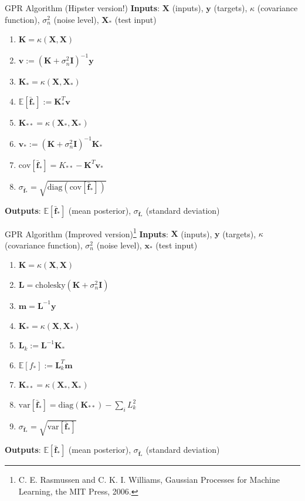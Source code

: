 \documentclass[10pt]{beamer}
\begin{document}
\begin{frame}[fragile]{GPR Algorithm (Hipster version!)}  %
	\textbf{Inputs}: $\mathbf{X}$ (inputs), $\mathbf{y}$ (targets), $\kappa$ (covariance function), $\sigma_n^2$ (noise level), $\mathbf{X}_*$ (test input)
	\begin{enumerate}
		\item $\mathbf{K} = \kappa (\mathbf{X}, \mathbf{X})$
		\item  $\mathbf{v} := (\mathbf{K} + \sigma^2_n \mathbf{I})^{-1} \mathbf{y}$
		\item $\mathbf{K}_* =  \kappa (\mathbf{X}, \mathbf{X}_*)$
		\item  $\mathbb{E} [\bar{\mathbf{f}}_*] := \mathbf{K}_*^T \mathbf{v} $
		\item $\mathbf{K}_{**} =  \kappa (\mathbf{X}_*, \mathbf{X}_*)$
		\item  $\mathbf{v}_* := (\mathbf{K} + \sigma^2_n \mathbf{I})^{-1} \mathbf{K}_*$
		\item  $\text{cov}[\bar{\mathbf{f}}_*] = K_{**} - \mathbf{K}^T \mathbf{v}_*$
		\item $\sigma_{\bar{\mathbf{f}}_*} = \sqrt{\text{diag} \left(\text{cov}[\bar{\mathbf{f}}_*]\right)}$
	\end{enumerate} 	
	\textbf{Outputs}: $\mathbb{E} [\bar{\mathbf{f}}_*]$ (mean posterior), $\sigma_{\bar{\mathbf{f}}_*}$ (standard deviation)
\end{frame}

\begin{frame}[fragile]{GPR Algorithm (Improved version)\footnote{C. E. Rasmussen and C. K. I. Williams, Gaussian Processes for Machine Learning, the MIT Press, 2006.}}  %
	\textbf{Inputs}: $\mathbf{X}$ (inputs), $\mathbf{y}$ (targets), $\kappa$ (covariance function), $\sigma_n^2$ (noise level), $\mathbf{x}_*$ (test input)
	\begin{enumerate}
		\item $\mathbf{K} = \kappa (\mathbf{X}, \mathbf{X})$
		\item $\mathbf{L} = \text{cholesky}(\mathbf{K} + \sigma^2_n \mathbf{I})$ 
		\item $\mathbf{m} = \mathbf{L}^{-1} \mathbf{y}$ 
		\item $\mathbf{K}_* =  \kappa (\mathbf{X}, \mathbf{X}_*)$
		\item  $\mathbf{L}_k := \mathbf{L}^{-1} \mathbf{K}_*$
		\item  $\mathbb{E} [f_*] := \mathbf{L}_k^T \mathbf{m} $
		\item $\mathbf{K}_{**} =  \kappa (\mathbf{X}_*, \mathbf{X}_*)$
		\item  $\text{var}[\bar{\mathbf{f}}_*] = \text{diag} \left(\mathbf{K}_{**}\right) - \sum_i L_k^2$
		\item $\sigma_{\bar{\mathbf{f}}_*} = \sqrt{\text{var}[\bar{\mathbf{f}}_*]}$
	\end{enumerate} 	
	\textbf{Outputs}: $\mathbb{E} [\bar{\mathbf{f}}_*]$ (mean posterior), $\sigma_{\bar{\mathbf{f}}_*}$ (standard deviation)
	\vspace*{1cm}
\end{frame}
\end{document}
